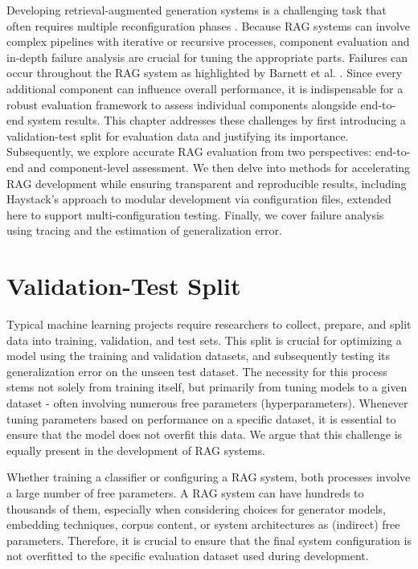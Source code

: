 Developing retrieval-augmented generation systems is a challenging task that often requires multiple reconfiguration phases \cite{Simon.10112024}. Because RAG systems can involve complex pipelines with iterative or recursive processes, component evaluation and in-depth failure analysis are crucial for tuning the appropriate parts. Failures can occur throughout the RAG system as highlighted by Barnett et al. \cite{Barnett.2024}. Since every additional component can influence overall performance, it is indispensable for a robust evaluation framework to assess individual components alongside end-to-end system results. This chapter addresses these challenges by first introducing a validation-test split for evaluation data and justifying its importance. Subsequently, we explore accurate RAG evaluation from two perspectives: end-to-end and component-level assessment. We then delve into methods for accelerating RAG development while ensuring transparent and reproducible results, including Haystack's approach to modular development via configuration files, extended here to support multi-configuration testing. Finally, we cover failure analysis using tracing and the estimation of generalization error.

\section{Validation-Test Split}\label{sec:valtestsplit}
Typical machine learning projects require researchers to collect, prepare, and split data into training, validation, and test sets. This split is crucial for optimizing a model using the training and validation datasets, and subsequently testing its generalization error on the unseen test dataset. The necessity for this process stems not solely from training itself, but primarily from tuning models to a given dataset - often involving numerous free parameters (hyperparameters). Whenever tuning parameters based on performance on a specific dataset, it is essential to ensure that the model does not overfit this data. We argue that this challenge is equally present in the development of RAG systems.

Whether training a classifier or configuring a RAG system, both processes involve a large number of free parameters. A RAG system can have hundreds to thousands of them, especially when considering choices for generator models, embedding techniques, corpus content, or system architectures as (indirect) free parameters. Therefore, it is crucial to ensure that the final system configuration is not overfitted to the specific evaluation dataset used during development.

